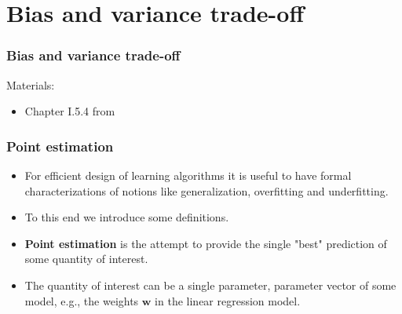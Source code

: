 \documentclass[notes]{beamer}          %
\newcommand{\vect}[1]{\bm{#1}}
\newif\iffull
\begin{document}
\iffull
\begin{frame}
\frametitle{Cross-validation}
    \begin{itemize}
        \item The original data is partitioned into $k$ (disjoint) subsets.
        \item The average error can be estimated by taking the average over $k$ trials.
        \item In trial $i$, the $i$-th subset is used as test set and the rest as training set.
        \item Problem: no unbiased estimators of the variance of such average error exist, but there are approximations that are used in practice.
    \end{itemize}
\end{frame}
\fi

\section{Bias and variance trade-off}

\begin{frame}
\frametitle{Bias and variance trade-off}
Materials:
\begin{itemize}
    \item Chapter I.5.4 from \cite{deeplearning}
\end{itemize}
\end{frame}


\begin{frame}
\frametitle{Point estimation}
    \begin{itemize}
        \item For efficient design of learning algorithms it is useful to have formal characterizations of notions like generalization, overfitting and underfitting.
        \item To this end we introduce some definitions.
        \item {\bf Point estimation} is the attempt to provide the single "best" prediction of some quantity of interest.
        \item The quantity of interest can be a single parameter, parameter vector of some model, e.g., the weights $\vect{w}$ in the linear regression model.
        \iffull
        \item It can also be a whole function, e.g., the linear function or polynomial of some degree, like in the polynomial regression.
        \fi
    \end{itemize}
\end{frame}
\end{document}

